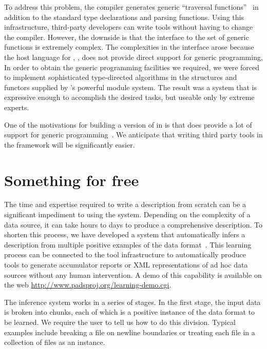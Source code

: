 \documentclass{sig-alternate}
\begin{document}
To address this problem, the \padsml{} compiler generates
generic ``traversal functions''~\cite{fernandez+:padl,mandelbaum+:pads-ml} 
in addition to the standard type declarations and parsing functions.
Using this infrastructure, third-party developers can write tools
without having to change the compiler.  However, the downside
is that the interface to the set of generic
functions is extremely complex. The complexities in the interface
arose because the host language for \padsml,
\ocaml{}, does not provide direct support for generic programming,
In order to obtain the generic programming facilities we required,
we were forced to implement sophisticated type-directed algorithms in the
structures and functors supplied by \ocaml{}'s powerful
module system.  The result was a system that is expressive enough to
accomplish the desired tasks, but useable only by extreme experts.  

One
of the motivations for building a version of \pads{} in \haskell{} is
that \haskell{} does provide a lot of support for generic
programming~\cite{Lammel+:syb,Wadler+:typeclass}.  We anticipate that
writing third party tools in the \padshaskell{} framework will be
significantly easier.

\section{Something for free}
\label{sec:inference}
The time and expertise required to write a \pads{} description from
scratch can be a significant impediment to using the system.
Depending on the complexity of a data source, it can take hours to
days to produce a comprehensive \pads{} description.  To shorten this
process, we have developed a system that automatically infers a
\pads{} description from multiple positive examples of the data
format~\cite{Fisher+:dirttoshovels}.  This learning process can be
connected to the \pads{} tool infrastructure to automatically produce
tools to generate accumulator reports or XML representations of ad hoc
data sources without any human intervention.  A demo of this
capability is available on the web
\url{http://www.padsproj.org/learning-demo.cgi}. 

The inference system works in a series of stages.  In the first stage,
the input data is broken into chunks, each of which is a positive
instance of the data format to be learned.  We require the user to
tell us how to do this division.  Typical examples include breaking a
file on newline boundaries or treating each file in a collection of
files as an instance.  
\end{document}
